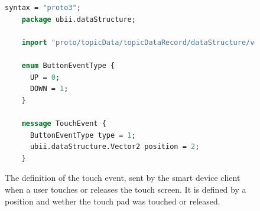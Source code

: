 \begin{figure}[H]
  \begin{lstlisting}[language=Protobuf]
    syntax = "proto3";
    package ubii.dataStructure;
    
    import "proto/topicData/topicDataRecord/dataStructure/vector2.proto";
    
    enum ButtonEventType {
      UP = 0;
      DOWN = 1;
    }

    message TouchEvent {
      ButtonEventType type = 1;
      ubii.dataStructure.Vector2 position = 2;
    }
  \end{lstlisting}
  \caption[Protobuf definition of the touch event]{The definition of the touch event, sent by the smart device client when a user touches or releases the touch screen. It is defined by a position and wether the touch pad was touched or released.}\label{fig:ubii-event-type}
\end{figure}